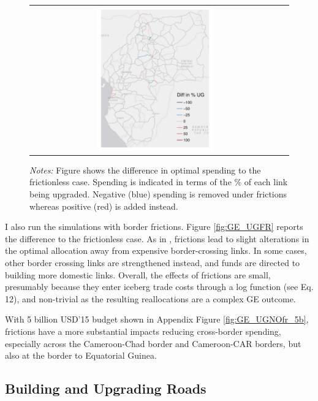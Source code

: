 \documentclass[a4paper]{article}
\begin{document}
\begin{figure}[H]
{\begin{tabular}{cc}
\includegraphics[width=0.48\textwidth]{"../figures/GE/trans_africa_network_GE_20g_2b_fixed_cgc_sigma3.8_rho2_julia_google_Ijk_bc_perc_ug_diff.pdf"}
\end{tabular}
}
\scriptsize 
\emph{Notes:} Figure shows the difference in optimal spending to the frictionless case. Spending is indicated in terms of the \% of each link being upgraded. Negative (blue) spending is removed under frictions whereas positive (red) is added instead. 
\end{figure}

I also run the simulations with border frictions. Figure \ref{fig:GE_UGFR} reports the difference to the frictionless case. As in \citet{krantz2024optimal}, frictions lead to slight alterations in the optimal allocation away from expensive border-crossing links. In some cases, other border crossing links are strengthened instead, and funds are directed to building more domestic links. Overall, the effects of frictions are small, presumably because they enter iceberg trade costs through a log function (see \citet{krantz2024optimal} Eq. 12), and non-trivial as the resulting reallocations are a complex GE outcome. \newline 

With 5 billion USD'15 budget shown in Appendix Figure \ref{fig:GE_UGNOfr_5b}, frictions have a more substantial impacts reducing cross-border spending, especially across the Cameroon-Chad border and Cameroon-CAR borders, but also at the border to Equatorial Guinea. 


\subsection{Building and Upgrading Roads} 
\end{document}
